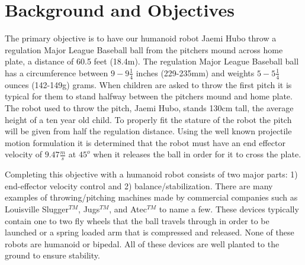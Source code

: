 \section{Background and Objectives}\label{sec:background}

The primary objective is to have our humanoid robot Jaemi Hubo throw a regulation Major League Baseball ball from the pitchers mound across home plate, a distance of 60.5 feet (18.4m).  
The regulation Major League Baseball ball has a circumference between $9 - 9\frac{1}{4}$ inches (229-235mm) and weights $5-5\frac{1}{4}$ ounces (142-149g) grams\cite{mlbrules}.  
When children are asked to throw the first pitch it is typical for them to stand halfway between the pitchers mound and home plate.
The robot used to throw the pitch, Jaemi Hubo, stands 130cm tall, the average height of a ten year old child.
To properly fit the stature of the robot the pitch will be given from half the regulation distance.
Using the well known projectile motion formulation it is determined that the robot must have an end effector velocity of $9.47\frac{m}{s}$ at $45^o$ when it releases the ball in order for it to cross the plate.





Completing this objective with a humanoid robot consists of two major parts: 1) end-effector velocity control and 2) balance/stabilization.
There are many examples of throwing/pitching machines made by commercial companies such as Louisville Slugger$^{TM}$, Jugs$^{TM}$, and Atec$^{TM}$ to name a few.  
These devices typically contain one to two fly wheels that the ball travels through in order to be launched or a spring loaded arm that is compressed and released.
None of these robots are humanoid or bipedal.
All of these devices are well planted to the ground to ensure stability.


